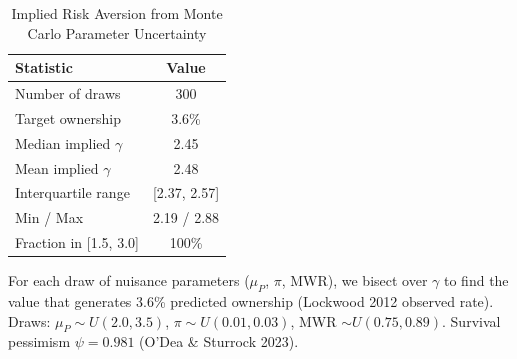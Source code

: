 \begin{table}[htbp]
\centering
\caption{Implied Risk Aversion from Monte Carlo Parameter Uncertainty}
\label{tab:implied_gamma}
\begin{tabular}{lc}
\toprule
Statistic & Value \\
\midrule
Number of draws & 300 \\
Target ownership & 3.6\% \\
Median implied $\gamma$ & 2.45 \\
Mean implied $\gamma$ & 2.48 \\
Interquartile range & [2.37, 2.57] \\
Min / Max & 2.19 / 2.88 \\
Fraction in [1.5, 3.0] & 100\% \\
\bottomrule
\end{tabular}
\begin{tablenotes}
\small
\item For each draw of nuisance parameters ($\mu_P$, $\pi$, MWR),
we bisect over $\gamma$ to find the value that generates 3.6\%
predicted ownership (Lockwood 2012 observed rate).
Draws: $\mu_P \sim U(2.0, 3.5)$, $\pi \sim U(0.01, 0.03)$, MWR $\sim U(0.75, 0.89)$.
Survival pessimism $\psi = 0.981$ (O'Dea \& Sturrock 2023).
\end{tablenotes}
\end{table}
